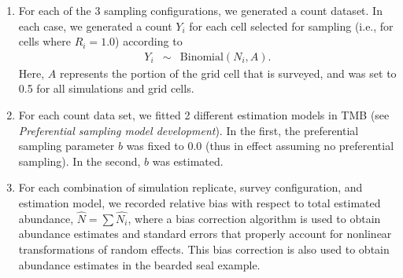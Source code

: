 \documentclass[times,mee,doublespace,]{besauth2}
\begin{document}
\begin{flushleft}
\begin{enumerate}
  \item For each of the 3 sampling configurations, we generated a count dataset.  In each case, we generated a count $Y_i$ for each cell selected for sampling (i.e., for cells where $R_i=1.0$) according to
      \begin{eqnarray*}
        Y_i & \sim & \textrm{Binomial}(N_i,A).
      \end{eqnarray*}
      Here, $A$ represents the portion of the grid cell that is surveyed, and was set to 0.5 for all simulations and grid cells.
  \item For each count data set, we fitted 2 different estimation models in TMB (see \textit{Preferential sampling model development}).  In the first, the preferential sampling parameter $b$ was fixed to 0.0 (thus in effect assuming no preferential sampling).  In the second, $b$ was estimated.
  \item For each combination of simulation replicate, survey configuration, and estimation model, we recorded relative bias with respect to total estimated abundance, $\hat{N} = \sum \hat{N_i}$, where a bias correction algorithm \citep{TierneyEtAl1989,ThorsonKristensen2016} is used to obtain abundance estimates and standard errors that properly account for nonlinear transformations of random effects.  This bias correction is also used to obtain abundance estimates in the bearded seal example.
\end{enumerate}





\pagebreak


\end{flushleft}
\end{document}
